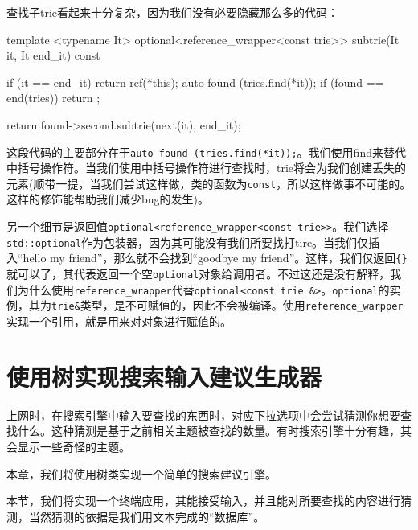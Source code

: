 查找子trie看起来十分复杂，因为我们没有必要隐藏那么多的代码：

\begin{codebox}[cpp]
template <typename It>
optional<reference_wrapper<const trie>>
subtrie(It it, It end_it) const {
    if (it == end_it) { return ref(*this); }
    auto found (tries.find(*it));
    if (found == end(tries)) { return {}; }

    return found->second.subtrie(next(it), end_it);
}
\end{codebox}

这段代码的主要部分在于\texttt{auto found (tries.find(*it));}。我们使用find来替代中括号操作符。当我们使用中括号操作符进行查找时，trie将会为我们创建丢失的元素(顺带一提，当我们尝试这样做，类的函数为\texttt{const}，所以这样做事不可能的。这样的修饰能帮助我们减少bug的发生)。

另一个细节是返回值\texttt{optional<reference\_wrapper<const trie>>}。我们选择\texttt{std::optional}作为包装器，因为其可能没有我们所要找打tire。当我们仅插入“hello my friend”，那么就不会找到“goodbye my friend”。这样，我们仅返回\texttt{\{\}}就可以了，其代表返回一个空\texttt{optional}对象给调用者。不过这还是没有解释，我们为什么使用\texttt{reference\_wrapper}代替\texttt{optional<const trie \&>}。\texttt{optional}的实例，其为\texttt{trie\&}类型，是不可赋值的，因此不会被编译。使用\texttt{reference\_warpper}实现一个引用，就是用来对对象进行赋值的。


\section{使用树实现搜索输入建议生成器}

上网时，在搜索引擎中输入要查找的东西时，对应下拉选项中会尝试猜测你想要查找什么。这种猜测是基于之前相关主题被查找的数量。有时搜索引擎十分有趣，其会显示一些奇怪的主题。


本章，我们将使用树类实现一个简单的搜索建议引擎。


本节，我们将实现一个终端应用，其能接受输入，并且能对所要查找的内容进行猜测，当然猜测的依据是我们用文本完成的“数据库”。

